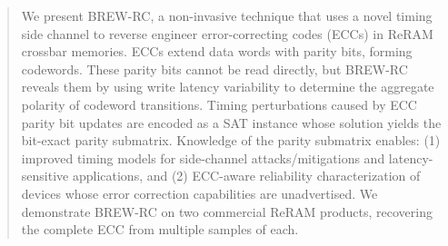 \begin{abstract}
We present BREW-RC, a non-invasive technique that uses a novel timing side channel to reverse engineer error-correcting codes (ECCs) in ReRAM crossbar memories.
%
ECCs extend data words with parity bits, forming codewords.
%
These parity bits cannot be read directly, 
but BREW-RC reveals them by using write latency variability to determine the aggregate polarity of codeword transitions.
%
Timing perturbations caused by ECC parity bit updates are encoded as a SAT instance whose solution yields the bit-exact parity submatrix. 
%
Knowledge of the parity submatrix enables: (1) improved timing models for side-channel attacks/mitigations and latency-sensitive applications, and (2) ECC-aware reliability characterization of devices whose error correction capabilities are unadvertised. 
%
We demonstrate BREW-RC on two commercial ReRAM products, recovering the complete ECC from multiple samples of each.
\end{abstract}